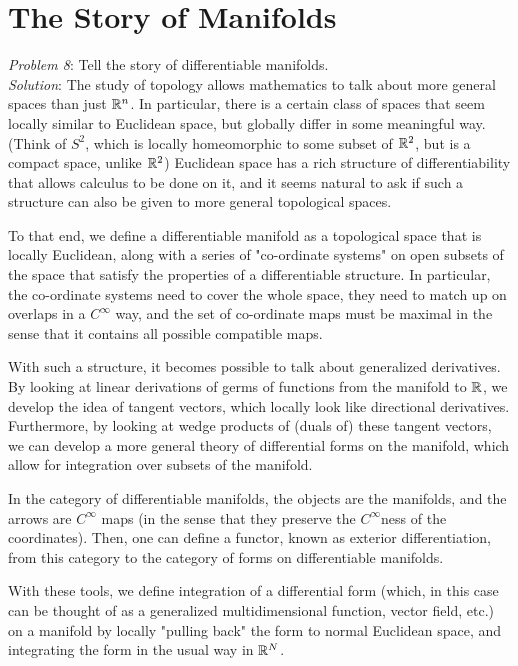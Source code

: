 \section{The Story of Manifolds}

\emph{Problem 8}: Tell the story of differentiable manifolds.
\\
\emph{Solution}:
The study of topology allows mathematics to talk about more general spaces than
just $\mathbb{R}^n$. In particular, there is a certain class of spaces that seem locally
similar to Euclidean space, but globally differ in some meaningful way. (Think
of $S^2$, which is locally homeomorphic to some subset of $\mathbb{R}^2$, but is
a compact space, unlike $\mathbb{R}^2$) Euclidean space has a rich
structure of differentiability that allows calculus to be done on it, and it
seems natural to ask if such a structure can also be given to more general
topological spaces.
\par
To that end, we define a differentiable manifold as a
topological space that is locally Euclidean, along with a series of "co-ordinate
systems" on open subsets of the space that satisfy the properties of a
differentiable structure. In particular, the co-ordinate systems need to cover
the whole space, they need to match up on overlaps in a $C^{\infty}$ way, and
the set of co-ordinate maps must be maximal in the sense that it contains all
possible compatible maps.
\par
With such a structure, it becomes possible to talk about generalized
derivatives. By looking at linear derivations of germs of functions from the
manifold to $\mathbb{R}$, we develop the idea of tangent vectors, which locally look
like directional derivatives. Furthermore, by looking at wedge products of
(duals of) these tangent vectors, we can develop a more general theory of
differential forms on the manifold, which allow for integration over subsets of
the manifold.
\par
In the category of differentiable manifolds, the objects are the manifolds, and
the arrows are $C^{\infty}$ maps (in the sense that they preserve the
$C^{\infty}$ness of the coordinates). Then, one can define a functor, known as
exterior differentiation, from this category to the category of forms on
differentiable manifolds.
\par
With these tools, we define integration of a differential form (which, in this
case can be thought of as a generalized multidimensional function, vector field,
etc.) on a manifold by locally "pulling back" the form to normal Euclidean
space, and integrating the form in the usual way in $\mathbb{R}^N$.
